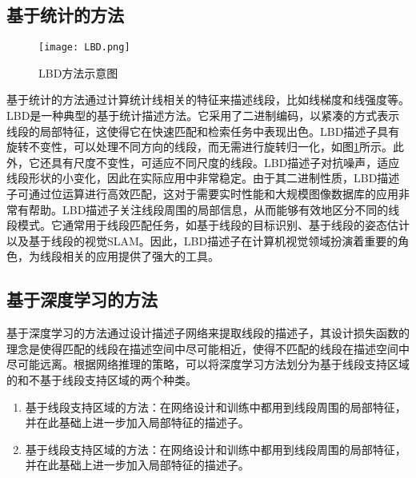 \subsection{基于统计的方法}
\begin{figure}
  \centering
  \texttt{[image: LBD.png]}
  \label{fig_LBD}
  \caption{LBD方法示意图}
\end{figure}
基于统计的方法通过计算统计线相关的特征来描述线段，比如线梯度和线强度等。LBD是一种典型的基于统计描述方法。它采用了二进制编码，以紧凑的方式表示线段的局部特征，这使得它在快速匹配和检索任务中表现出色。LBD描述子具有旋转不变性，可以处理不同方向的线段，而无需进行旋转归一化，如图\ref{fig_LBD}所示。此外，它还具有尺度不变性，可适应不同尺度的线段。LBD描述子对抗噪声，适应线段形状的小变化，因此在实际应用中非常稳定。由于其二进制性质，LBD描述子可通过位运算进行高效匹配，这对于需要实时性能和大规模图像数据库的应用非常有帮助。LBD描述子关注线段周围的局部信息，从而能够有效地区分不同的线段模式。它通常用于线段匹配任务，如基于线段的目标识别、基于线段的姿态估计以及基于线段的视觉SLAM。因此，LBD描述子在计算机视觉领域扮演着重要的角色，为线段相关的应用提供了强大的工具。

\subsection{基于深度学习的方法}
基于深度学习的方法通过设计描述子网络来提取线段的描述子，其设计损失函数的理念是使得匹配的线段在描述空间中尽可能相近，使得不匹配的线段在描述空间中尽可能远离。根据网络推理的策略，可以将深度学习方法划分为基于线段支持区域的和不基于线段支持区域的两个种类。
\begin{enumerate}
  \item 基于线段支持区域的方法：在网络设计和训练中都用到线段周围的局部特征，并在此基础上进一步加入局部特征的描述子。
  \item 基于线段支持区域的方法：在网络设计和训练中都用到线段周围的局部特征，并在此基础上进一步加入局部特征的描述子。
\end{enumerate}


